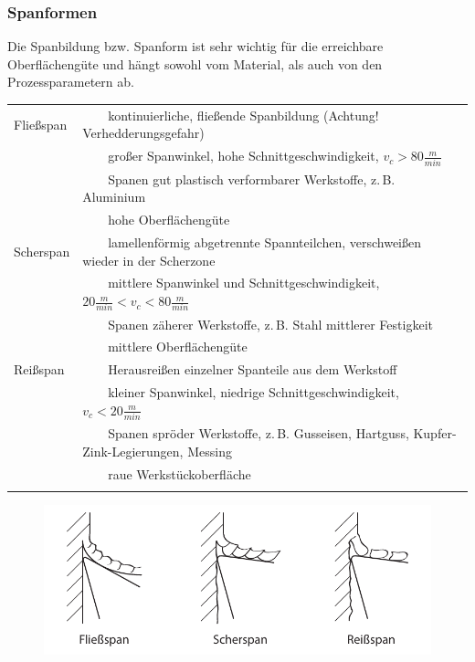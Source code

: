 \documentclass{\basedir/fablab-document}
\newcommand{\tabitem}{~~\llap{\textbullet}~~}
\begin{document}
\subsubsection{Spanformen}
Die Spanbildung bzw. Spanform ist sehr wichtig für die erreichbare Oberflächengüte und hängt sowohl vom Material, als auch von den Prozessparametern ab. \\[1em]
\begin{tabular}{ll}
    Fließspan		& \tabitem kontinuierliche, fließende Spanbildung (Achtung! Verhedderungsgefahr)													\\ 
								&	\tabitem großer Spanwinkel, hohe Schnittgeschwindigkeit, $v_c > 80 \frac{m}{min} $											\\
								&	\tabitem Spanen gut plastisch verformbarer Werkstoffe, z.\,B. Aluminium																		\\
								&	\tabitem hohe Oberflächengüte																																						\\ \addlinespace
    Scherspan		& \tabitem lamellenförmig abgetrennte Spannteilchen, verschweißen wieder in der Scherzone									\\ 
								&	\tabitem mittlere Spanwinkel und Schnittgeschwindigkeit, $20 \frac{m}{min} < v_c < 80 \frac{m}{min} $		\\
								&	\tabitem Spanen zäherer Werkstoffe, z.\,B. Stahl mittlerer Festigkeit 																		\\
								&	\tabitem mittlere Oberflächengüte																																				\\ \addlinespace
    Reißspan		& \tabitem Herausreißen einzelner Spanteile aus dem Werkstoff																							\\ 
								&	\tabitem kleiner Spanwinkel, niedrige Schnittgeschwindigkeit, $v_c < 20 \frac{m}{min} $									\\
								&	\tabitem Spanen spröder Werkstoffe, z.\,B. Gusseisen, Hartguss, Kupfer-Zink-Legierungen, Messing					\\
								&	\tabitem raue Werkstückoberfläche																																				\\ \addlinespace
\end{tabular}
\begin{figure}[ht]
\centering
\includegraphics[width = \linewidth]{img/spanformen}
\end{figure}
\end{document}
